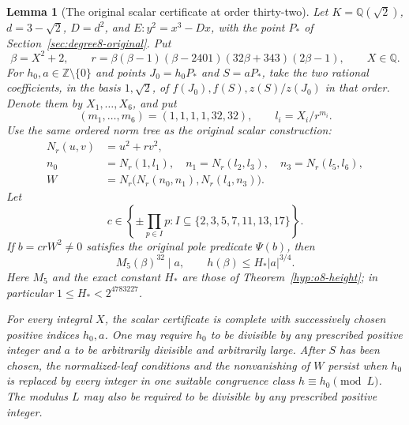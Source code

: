 \documentclass[11pt]{article}
\newtheorem{lemma}[theorem]{Lemma}
\theoremstyle{definition}
\theoremstyle{remark}
\newcommand{\Q}{\mathbb Q}
\newcommand{\Z}{\mathbb Z}
\begin{document}
\begin{lemma}[The original scalar certificate at order thirty-two]
\label{v5:scalar32-bridge}
Let $K=\Q(\sqrt2)$, $d=3-\sqrt2$, $D=d^2$, and
$E:y^2=x^3-Dx$, with the point $P_*$ of
Section~\ref{sec:degree8-original}. Put
\[
 \beta=X^2+2,\qquad
 r=\beta(\beta-1)(\beta-2401)(32\beta+343)(2\beta-1),
 \qquad X\in\Q.
\]
For $h_0,a\in\Z\setminus\{0\}$ and points $J_0=h_0P_*$ and $S=aP_*$,
take the
two rational coefficients, in the basis $1,\sqrt2$, of
$f(J_0),f(S),z(S)/z(J_0)$ in that order. Denote them by
$X_1,\ldots,X_6$, and put
\[
 (m_1,\ldots,m_6)=(1,1,1,1,32,32),\qquad l_i=X_i/r^{m_i}.
\]
Use the same ordered norm tree as the original scalar construction:
\[
 \begin{split}
 N_r(u,v)&=u^2+rv^2,\\
 n_0&=N_r(1,l_1),\quad n_1=N_r(l_2,l_3),\quad
 n_3=N_r(l_5,l_6),\\
 W&=N_r\bigl(N_r(n_0,n_1),N_r(l_4,n_3)\bigr).
 \end{split}
\]
Let
\[
 c\in\left\{\pm\prod_{p\in I}p:
                   I\subseteq\{2,3,5,7,11,13,17\}\right\}.
\]
If $b=crW^2\ne0$ satisfies the original pole predicate $\Psi(b)$,
then
\[
 M_5(\beta)^{32}\mid a,\qquad
 h(\beta)\le H_*|a|^{3/4}.
\]
Here $M_5$ and the exact constant $H_*$ are those of
Theorem~\ref{hyp:o8-height}; in particular
$1\le H_*<2^{4783227}$.

For every integral $X$, the scalar certificate is complete with
successively chosen positive indices $h_0,a$. One may require $h_0$
to be divisible by any prescribed positive integer and $a$ to be
arbitrarily divisible and arbitrarily large. After $S$ has been chosen,
the normalized-leaf conditions and the nonvanishing of $W$ persist when
$h_0$ is replaced by every integer in one suitable congruence class
$h\equiv h_0\pmod L$. The modulus $L$ may also be required to be
divisible by any prescribed positive integer.
\end{lemma}
\end{document}
